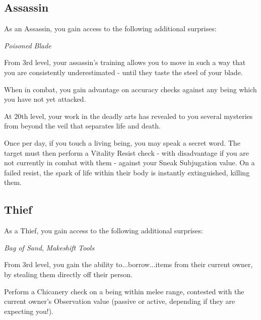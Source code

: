\subsection*{\bf Assassin}


As an Assassin, you gain access to the following additional surprises:

{\it Poisoned Blade}


From 3rd level, your assassin's training allows you to move in such a way that you are consistently underestimated - until they taste the steel of your blade. 

When in combat, you gain advantage on accuracy checks against any being which you have not yet attacked.








At 20th level, your work in the deadly arts has revealed to you several mysteries from beyond the veil that separates life and death.

Once per day, if you touch a living being, you may speak a secret word. The target must then perform a Vitality Resist check - with disadvantage if you are not currently in combat with them -  against your Sneak Subjugation value. On a failed resist, the spark of life within their body is instantly extinguished, killing them. 


\subsection*{\bf Thief}


As a Thief, you gain access to the following additional surprises:

{\it Bag of Sand}, {\it Makeshift Tools}




From 3rd level, you gain the ability to...borrow...items from their current owner, by stealing them directly off their person. 

Perform a Chicanery check on a being within melee range, contested with the current owner's Observation value (passive or active, depending if they are expecting you!). 

